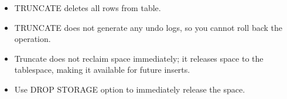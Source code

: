 
\begin{flushleft}
	\begin{itemize}
		\item TRUNCATE deletes all rows from table.
		\item TRUNCATE does not generate any undo logs, so you cannot roll back the operation.
		\item Truncate does not reclaim space immediately; it releases space to the tablespace, making it available for future inserts. \item Use DROP STORAGE option to immediately release the space.
		\bigskip
		\bigskip
		
	\end{itemize}
	
	
\end{flushleft}
